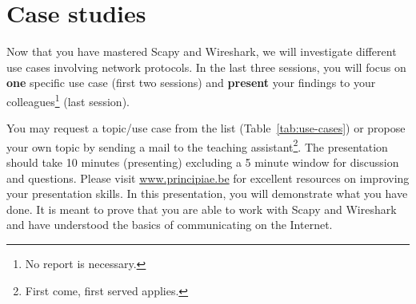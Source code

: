 \documentclass[11pt,a4paper]{article}
\begin{document}




\section{Case studies}\label{sec:use-cases}
Now that you have mastered Scapy and Wireshark, we will investigate different use cases involving network protocols. In the last three sessions, you will focus on \textbf{one} specific use case (first two sessions) and \textbf{present} your findings to your colleagues\footnote{No report is necessary.} (last session). 

You may request a topic/use case from the list (Table~\ref{tab:use-cases}) or propose your own topic by sending a mail to the teaching assistant\footnote{First come, first served applies.}. The presentation should take 10 minutes (presenting) excluding a 5 minute window for discussion and questions. Please visit \url{www.principiae.be} for excellent resources on improving your presentation skills. In this presentation, you will demonstrate what you have done. It is meant to prove that you are able to work with Scapy and Wireshark and have understood the basics of communicating on the Internet.
\end{document}
